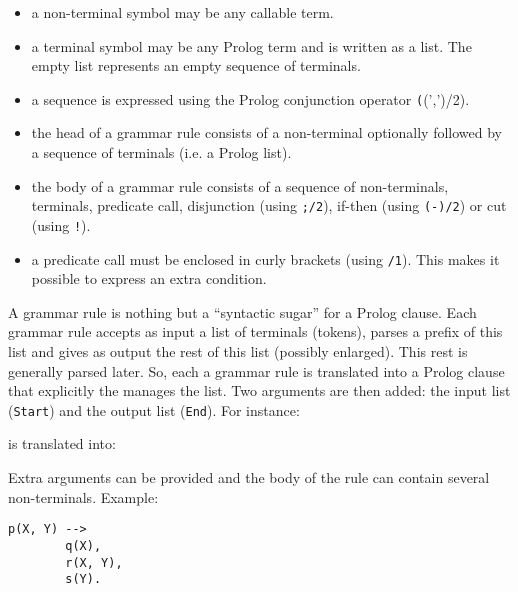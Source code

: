 \begin{itemize}

\item a non-terminal symbol may be any callable term.

\item a terminal symbol may be any Prolog term and is written as a list. The
  empty list represents an empty sequence of terminals.

\item a sequence is expressed using the Prolog conjunction operator
  \texttt((',')/2).

\item the head of a grammar rule consists of a non-terminal optionally
  followed by a sequence of terminals (i.e. a Prolog list).

\item the body of a grammar rule consists of a sequence of non-terminals,
  terminals, predicate call, disjunction (using \texttt{;/2}), if-then (using
  \texttt{(-{\gt})/2}) or cut (using \texttt{!}).

\item a predicate call must be enclosed in curly brackets (using
  \texttt{{\lb}{\rb}/1}). This makes it possible to express an extra
  condition.

\end{itemize}

A grammar rule is nothing but a ``syntactic sugar'' for a Prolog clause. Each
grammar rule accepts as input a list of terminals (tokens), parses a prefix
of this list and gives as output the rest of this list (possibly enlarged).
This rest is generally parsed later. So, each a grammar rule is translated
into a Prolog clause that explicitly the manages the list. Two arguments
are then added: the input list (\texttt{Start}) and the output list
(\texttt{End}). For instance:


is translated into:


Extra arguments can be provided and the body of the rule can contain several
non-terminals. Example:

\begin{Indentation}
\begin{verbatim}
p(X, Y) -->
        q(X),
        r(X, Y),
        s(Y).
\end{verbatim}
\end{Indentation}

